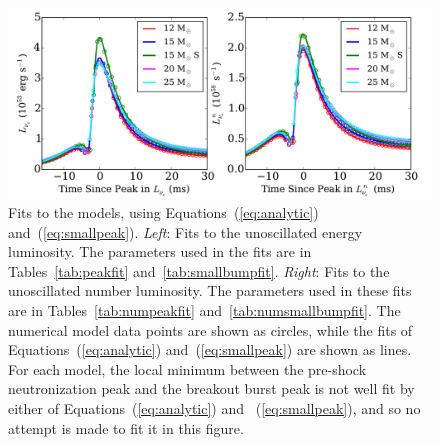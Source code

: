 \begin{figure}[h]
\centering
\includegraphics[width=0.85\linewidth]{fittingdemo.pdf}
\caption{\label{fig:fit}Fits to the models, using
  Equations~(\ref{eq:analytic}) and~(\ref{eq:smallpeak}).  
{\it Left}: Fits to the unoscillated energy
  luminosity.  The parameters used in the fits are in
  Tables~\ref{tab:peakfit} and~\ref{tab:smallbumpfit}.
 {\it Right}: Fits to the unoscillated number
  luminosity.  The parameters used in these fits are in
  Tables~\ref{tab:numpeakfit} and~\ref{tab:numsmallbumpfit}.
The numerical model data
  points are shown as circles, while the fits of
  Equations~(\ref{eq:analytic}) and~(\ref{eq:smallpeak})  are shown as
  lines.  For each model, the local minimum between the
  pre-shock neutronization peak and the breakout burst peak is not
  well fit by either of Equations~(\ref{eq:analytic}) and
  ~(\ref{eq:smallpeak}), and so no attempt is made to fit it in this figure.
}
\end{figure}

